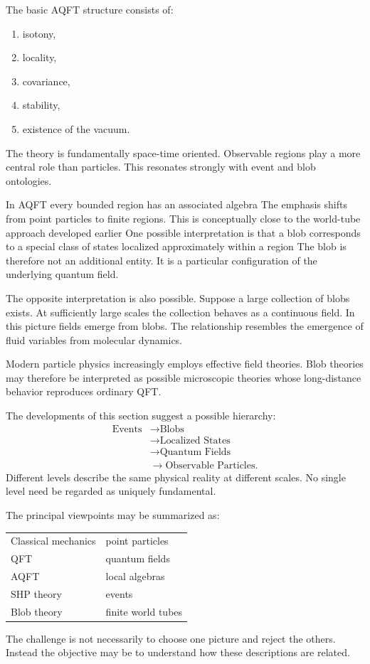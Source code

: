 The basic AQFT structure consists of:
\begin{enumerate}
\item isotony,
\item locality,
\item covariance,
\item stability,
\item existence of the vacuum.
\end{enumerate}
The theory is fundamentally space-time oriented.
Observable regions play a more central role than particles.
This resonates strongly with event and blob ontologies.

In AQFT every bounded region
has an associated algebra
The emphasis shifts from point particles to finite regions.
This is conceptually close to the world-tube approach developed earlier
One possible interpretation is that a blob corresponds to a special
class of states
localized approximately within a region
The blob is therefore not an additional entity.
It is a particular configuration of the underlying quantum field.

The opposite interpretation is also possible.
Suppose a large collection of blobs exists.
At sufficiently large scales the collection behaves as a continuous
field.
In this picture fields emerge from blobs.
The relationship resembles the emergence of fluid variables from
molecular dynamics.

Modern particle physics increasingly employs effective field theories.
Blob theories may therefore be interpreted as possible microscopic
theories whose long-distance behavior reproduces ordinary QFT.

The developments of this section suggest a possible hierarchy:
\begin{align}
\text{Events}&\rightarrow \text{Blobs}\\
&\rightarrow \text{Localized States}\\
&\rightarrow \text{Quantum Fields}\\
&\rightarrow \text{Observable Particles}.
\end{align}
Different levels describe the same physical reality at different scales.
No single level need be regarded as uniquely fundamental.

The principal viewpoints may be summarized as:
\begin{center}
\begin{tabular}{ll}
Classical mechanics & point particles \\
QFT & quantum fields \\
AQFT & local algebras \\
SHP theory & events \\
Blob theory & finite world tubes
\end{tabular}
\end{center}
The challenge is not necessarily to choose one picture and reject the
others.
Instead the objective may be to understand how these descriptions are
related.

